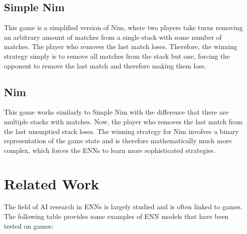 \begin{enumerate}
\subsection{Simple Nim}\label{subsec:simple-nim}
This game is a simplified version of Nim, where two players take turns removing an arbitrary amount of matches from a single stack with some number of matches.
The player who removes the last match loses.
Therefore, the winning strategy simply is to remove all matches from the stack but one, forcing the opponent to remove the last match and therefore making them lose.

\subsection{Nim}\label{subsec:nim}
This game works similarly to Simple Nim with the difference that there are multiple stacks with matches.
Now, the player who removes the last match from the last unemptied stack loses.
The winning strategy for Nim involves a binary representation of the game state\cite{rosenbloom2003} and is therefore mathematically much more complex, which forces the ENNs to learn more sophisticated strategies.


\section{Related Work}\label{sec:related-work}
The field of AI research in ENNs is largely studied and is often linked to games.
The following table provides some examples of ENN models that have been tested on games:


\end{enumerate}
